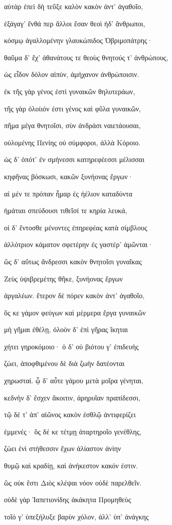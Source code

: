 \begin{pages}
\begin{Leftside}
αὐτὰρ ἐπεὶ δὴ τεῦξε καλὸν κακὸν ἀντ' ἀγαθοῖο,  

ἐξάγαγ' ἔνθά περ ἄλλοι ἔσαν θεοὶ ἠδ' ἄνθρωποι,

κόσμῳ ἀγαλλομένην γλαυκώπιδος Ὀβριμοπάτρης· 

θαῦμα δ' ἔχ' ἀθανάτους τε θεοὺς θνητούς τ' ἀνθρώπους,

ὡς εἶδον δόλον αἰπύν, ἀμήχανον ἀνθρώποισιν.

ἐκ τῆς γὰρ γένος ἐστὶ γυναικῶν θηλυτεράων, 

τῆς γὰρ ὀλοίιόν ἐστι γένος καὶ φῦλα γυναικῶν,

πῆμα μέγα θνητοῖσι, σὺν ἀνδράσι ναιετάουσαι,

οὐλομένης Πενίης οὐ σύμφοροι, ἀλλὰ Κόροιο.

ὡς δ' ὁπότ' ἐν σμήνεσσι κατηρεφέεσσι μέλισσαι

κηφῆνας βόσκωσι, κακῶν ξυνήονας ἔργων· 

αἱ μέν τε πρόπαν ἦμαρ ἐς ἠέλιον καταδύντα

ἠμάτιαι σπεύδουσι τιθεῖσί τε κηρία λευκά,

οἱ δ' ἔντοσθε μένοντες ἐπηρεφέας κατὰ σίμβλους 

ἀλλότριον κάματον σφετέρην ἐς γαστέρ' ἀμῶνται· 

ὣς δ' αὔτως ἄνδρεσσι κακὸν θνητοῖσι γυναῖκας 

Ζεὺς ὑψιβρεμέτης θῆκε, ξυνήονας ἔργων

ἀργαλέων. ἕτερον δὲ πόρεν κακὸν ἀντ' ἀγαθοῖο,

ὅς κε γάμον φεύγων καὶ μέρμερα ἔργα γυναικῶν

μὴ γῆμαι ἐθέλῃ, ὀλοὸν δ' ἐπὶ γῆρας ἵκηται

χήτει γηροκόμοιο· ὁ δ' οὐ βιότου γ' ἐπιδευὴς  

ζώει, ἀποφθιμένου δὲ διὰ ζωὴν δατέονται

χηρωσταί. ᾧ δ' αὖτε γάμου μετὰ μοῖρα γένηται, 

κεδνὴν δ' ἔσχεν ἄκοιτιν, ἀρηρυῖαν πραπίδεσσι, 

τῷ δέ τ' ἀπ' αἰῶνος κακὸν ἐσθλῷ ἀντιφερίζει

ἐμμενές· ὃς δέ κε τέτμῃ ἀταρτηροῖο γενέθλης,  

ζώει ἐνὶ στήθεσσιν ἔχων ἀλίαστον ἀνίην

θυμῷ καὶ κραδίῃ, καὶ ἀνήκεστον κακόν ἐστιν.

ὣς οὐκ ἔστι Διὸς κλέψαι νόον οὐδὲ παρελθεῖν.

οὐδὲ γὰρ Ἰαπετιονίδης ἀκάκητα Προμηθεὺς

τοῖό γ' ὑπεξήλυξε βαρὺν χόλον, ἀλλ' ὑπ' ἀνάγκης 


\end{Leftside}
\end{pages}
